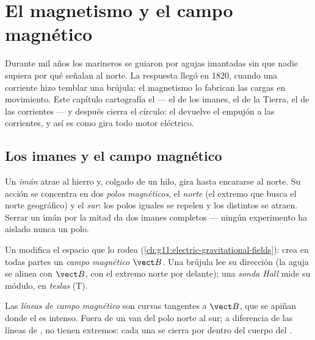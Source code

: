 \chapter{El magnetismo y el campo magnético}\label{ch:g11:magnetic-fields}

Durante mil años los marineros se guiaron por agujas imantadas sin que
nadie supiera por qué señalan al norte. La respuesta llegó en 1820,
cuando una corriente hizo temblar una brújula: el magnetismo lo fabrican
las cargas en movimiento. Este capítulo cartografía el 
--- el de los imanes, el de la Tierra, el de las corrientes --- y
después cierra el círculo: el  devuelve el empujón a las
corrientes, y así es como gira todo motor eléctrico.

\section{Los imanes y el campo magnético}

\begin{definition}\label{def:g11:magnetic-fields:magnet}
Un \emph{imán} atrae al hierro y, colgado de un hilo, gira
hasta encararse al norte. Su acción se concentra en dos \emph{polos
magnéticos}, el \emph{norte} (el extremo que busca
el norte geográfico) y el \emph{sur}: los polos iguales se repelen y los
distintos se atraen. Serrar un imán por la mitad da dos imanes completos
--- ningún experimento ha aislado nunca un polo.
\end{definition}

\begin{definition}\label{def:g11:magnetic-fields:bfield}
Un  modifica el espacio que lo rodea
(\cref{ch:g11:electric-gravitational-fields}): crea en todas partes un
\emph{campo magnético} $\vect B$. Una brújula lee
su dirección (la aguja se alinea con $\vect B$, con el extremo norte por
delante); una \emph{sonda Hall} mide su módulo, en
\emph{teslas} (\unit{T}).
\end{definition}

\begin{definition}\label{def:g11:magnetic-fields:lines}
Las \emph{líneas de campo magnético} son
curvas tangentes a $\vect B$, que se apiñan donde el  es intenso.
Fuera de un  van del polo norte al sur; a diferencia de las líneas
de , no tienen extremos: cada una se cierra por dentro
del cuerpo del .
\end{definition}

